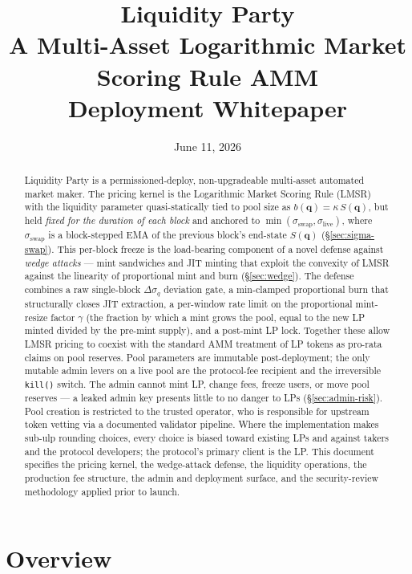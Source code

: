 \documentclass[11pt]{article}
\title{Liquidity Party\\
       \large A Multi-Asset Logarithmic Market Scoring Rule AMM\\
       \large Deployment Whitepaper}
\author{}
\date{June 11, 2026}
\newcommand{\Sm}{S(\mathbf{q})}
\newcommand{\bofq}{b(\mathbf{q})}
\begin{document}
\maketitle

\begin{abstract}
Liquidity Party is a permissioned-deploy, non-upgradeable multi-asset
automated market maker. The pricing kernel is the Logarithmic Market
Scoring Rule (LMSR) with the liquidity parameter quasi-statically tied
to pool size as $\bofq = \kappa\,\Sm$, but held \emph{fixed for the
duration of each block} and anchored to $\min(\sigma_{\mathrm{swap}},
\sigma_{\mathrm{live}})$, where $\sigma_{\mathrm{swap}}$ is a
block-stepped EMA of the previous block's end-state $\Sm$
(\S\ref{sec:sigma-swap}). This per-block freeze is the load-bearing
component of a novel defense against \emph{wedge attacks} --- mint
sandwiches and JIT minting that exploit the convexity of LMSR against
the linearity of proportional mint and burn (\S\ref{sec:wedge}). The
defense combines a raw single-block $\Delta\sigma_q$ deviation gate, a
min-clamped proportional burn that structurally closes JIT extraction, a
per-window rate limit on the proportional mint-resize factor $\gamma$
(the fraction by which a mint grows the pool, equal to the new LP minted
divided by the pre-mint supply), and a post-mint LP lock. Together
these allow LMSR pricing to coexist with the standard AMM treatment of
LP tokens as pro-rata claims on pool reserves. Pool parameters are immutable post-deployment; the
only mutable admin levers on a live pool are the protocol-fee recipient
and the irreversible \texttt{kill()} switch. The admin cannot mint LP,
change fees, freeze users, or move pool reserves --- a leaked admin key
presents little to no danger to LPs (\S\ref{sec:admin-risk}). Pool
creation is restricted to the trusted operator, who is responsible for
upstream token vetting via a documented validator pipeline. Where the
implementation makes sub-ulp rounding choices, every choice is biased
toward existing LPs and against takers and the protocol developers; the
protocol's primary client is the LP. This document specifies the pricing
kernel, the wedge-attack defense, the liquidity operations, the
production fee structure, the admin and deployment surface, and the
security-review methodology applied prior to launch.
\end{abstract}

\tableofcontents

\section{Overview}
\label{sec:overview}
\end{document}
